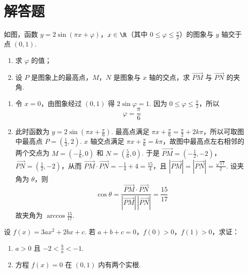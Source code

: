 \section{解答题}
\begin{problem}
如图，函数 \( y = 2\sin (\pi x + \varphi) \)，\( x \in \R \)（其中 \(0 \leqslant \varphi \leqslant \frac{\pi}{2}\)）的图象与 \(y\) 轴交于点 \((0,1)\).

\begin{enumerate}
\item 求 \(\varphi\) 的值；
\item 设 \(P\) 是图象上的最高点，\(M\)，\(N\) 是图象与 \(x\) 轴的交点，求 \(\overrightarrow{PM}\) 与 \(\overrightarrow{PN}\) 的夹角.
\end{enumerate}

\end{problem}

\begin{solution}
\begin{enumerate}
\item
令 \(x=0\)，由图象经过 \((0,1)\) 得 \(2\sin\varphi=1\). 因为 \(0\leqslant\varphi\leqslant\frac\pi2\)，所以
\[
\varphi=\frac\pi6
\]
\item
此时函数为 \(y=2\sin\left(\pi x+\frac\pi6\right)\). 最高点满足 \(\pi x+\frac\pi6=\frac\pi2+2k\pi\)，所以可取图中最高点 \(P=\left(\frac13,2\right)\). \(x\) 轴交点满足 \(\pi x+\frac\pi6=k\pi\)，故图中最高点左右相邻的两个交点为 \(M=\left(-\frac16,0\right)\) 和 \(N=\left(\frac56,0\right)\). 于是
\(\overrightarrow{PM}=\left(-\frac12,-2\right)\)，\(\overrightarrow{PN}=\left(\frac12,-2\right)\)，从而 \(\overrightarrow{PM}\cdot\overrightarrow{PN}=-\frac14+4=\frac{15}{4}\)，且 \(|\overrightarrow{PM}|=|\overrightarrow{PN}|=\frac{\sqrt{17}}2\).
设夹角为 \(\theta\)，则
\[
\cos\theta=\frac{\overrightarrow{PM}\cdot\overrightarrow{PN}}{|\overrightarrow{PM}|\,|\overrightarrow{PN}|}=\frac{15}{17}
\]
故夹角为 \(\arccos\frac{15}{17}\).
\end{enumerate}
\end{solution}

\begin{problem}
设 \( f(x)=3ax^{2}+2bx+c \). 若 \( a+b+c=0 \)，\( f(0)>0 \)，\( f(1)>0 \)，求证：

\begin{enumerate}
\item \(a > 0\) 且 \(-2 < \frac{b}{a} < -1\).
\item 方程 \( f(x)=0 \) 在 \((0,1)\) 内有两个实根.
\end{enumerate}
\end{problem}

